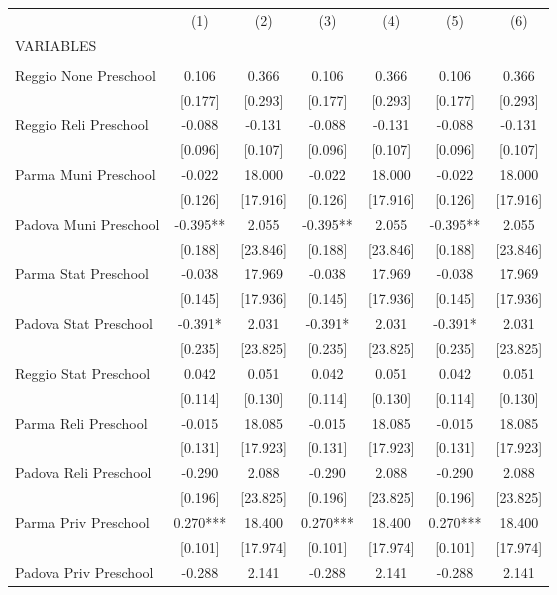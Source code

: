 \begin{tabular}{lcccccc} \hline
 & (1) & (2) & (3) & (4) & (5) & (6) \\
VARIABLES &  &  &  &  &  &  \\ \hline
 &  &  &  &  &  &  \\
Reggio None Preschool & 0.106 & 0.366 & 0.106 & 0.366 & 0.106 & 0.366 \\
 & [0.177] & [0.293] & [0.177] & [0.293] & [0.177] & [0.293] \\
Reggio Reli Preschool & -0.088 & -0.131 & -0.088 & -0.131 & -0.088 & -0.131 \\
 & [0.096] & [0.107] & [0.096] & [0.107] & [0.096] & [0.107] \\
Parma Muni Preschool & -0.022 & 18.000 & -0.022 & 18.000 & -0.022 & 18.000 \\
 & [0.126] & [17.916] & [0.126] & [17.916] & [0.126] & [17.916] \\
Padova Muni Preschool & -0.395** & 2.055 & -0.395** & 2.055 & -0.395** & 2.055 \\
 & [0.188] & [23.846] & [0.188] & [23.846] & [0.188] & [23.846] \\
Parma Stat Preschool & -0.038 & 17.969 & -0.038 & 17.969 & -0.038 & 17.969 \\
 & [0.145] & [17.936] & [0.145] & [17.936] & [0.145] & [17.936] \\
Padova Stat Preschool & -0.391* & 2.031 & -0.391* & 2.031 & -0.391* & 2.031 \\
 & [0.235] & [23.825] & [0.235] & [23.825] & [0.235] & [23.825] \\
Reggio Stat Preschool & 0.042 & 0.051 & 0.042 & 0.051 & 0.042 & 0.051 \\
 & [0.114] & [0.130] & [0.114] & [0.130] & [0.114] & [0.130] \\
Parma Reli Preschool & -0.015 & 18.085 & -0.015 & 18.085 & -0.015 & 18.085 \\
 & [0.131] & [17.923] & [0.131] & [17.923] & [0.131] & [17.923] \\
Padova Reli Preschool & -0.290 & 2.088 & -0.290 & 2.088 & -0.290 & 2.088 \\
 & [0.196] & [23.825] & [0.196] & [23.825] & [0.196] & [23.825] \\
Parma Priv Preschool & 0.270*** & 18.400 & 0.270*** & 18.400 & 0.270*** & 18.400 \\
 & [0.101] & [17.974] & [0.101] & [17.974] & [0.101] & [17.974] \\
Padova Priv Preschool & -0.288 & 2.141 & -0.288 & 2.141 & -0.288 & 2.141 \\

\end{tabular}
